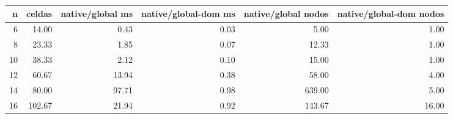 \begin{tabular}{rrrrrr}
\toprule
n & celdas & native/global ms & native/global-dom ms & native/global nodos & native/global-dom nodos \\
\midrule
6 & 14.00 & 0.43 & 0.03 & 5.00 & 1.00 \\
8 & 23.33 & 1.85 & 0.07 & 12.33 & 1.00 \\
10 & 38.33 & 2.12 & 0.10 & 15.00 & 1.00 \\
12 & 60.67 & 13.94 & 0.38 & 58.00 & 4.00 \\
14 & 80.00 & 97.71 & 0.98 & 639.00 & 5.00 \\
16 & 102.67 & 21.94 & 0.92 & 143.67 & 16.00 \\
\bottomrule
\end{tabular}
